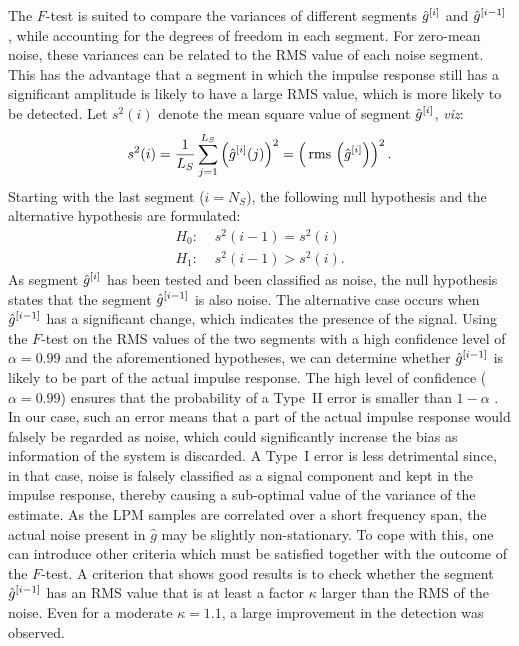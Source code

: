 \begin{enumerate}
  The $F$-test is suited to compare the variances of different segments ${\hat{g}}^{[i]}$ and ${\hat{g}}^{[i-1]}$ \cite{Parsons1974}, while accounting for the degrees of freedom in each segment.
  For zero-mean noise, these variances can be related to the RMS value of each noise segment.
  This has the advantage that a segment in which the impulse response still has a significant amplitude is likely to have a large RMS value, which is more likely to be detected.
  Let $s^2(i)$ denote the mean square value of segment ${\hat{g}}^{[i]}$, \emph{viz}:
  \begin{equation}
    s^2(i) = \frac{1}{L_S} \sum_{j=1}^{L_S} \left({\hat{g}}^{[i]}(j)\right)^2
           = \left( \,\mathrm{rms}\,\left(\hat{g}^{[i]}\right) \right)^2
           \text{.}
  \end{equation}
  Starting with the last segment ($i = N_S$), the following null hypothesis and the alternative hypothesis are formulated:
  \begin{align}
     H_0 :&\,\, s^2(i-1) = s^2(i)\\
     H_1 :&\,\, s^2(i-1) > s^2(i)
     \text{.}
  \end{align}
  As segment ${\hat{g}}^{[i]}$ has been tested and been classified as noise, the null hypothesis states that the segment ${\hat{g}}^{[i-1]}$ is also noise.
  The alternative case occurs when ${\hat{g}}^{[i-1]}$ has a significant change, which indicates the presence of the signal.
  Using the $F$-test on the RMS values of the two segments with a high confidence level of $\alpha=0.99$ and the aforementioned hypotheses, we can determine whether ${\hat{g}}^{[i-1]}$ is likely to be part of the actual impulse response.
  The high level of confidence ($\alpha=0.99$) ensures that the probability of a Type~II error is smaller than $1-\alpha$ \cite{Parsons1974}.
  In our case, such an error means that a part of the actual impulse response would falsely be regarded as noise, which could significantly increase the bias as information of the system is discarded.
  A Type~I error is less detrimental since, in that case, noise is falsely classified as a signal component and kept in the impulse response, thereby causing a sub-optimal value of the variance of the estimate.
  As the LPM samples are correlated over a short frequency span, the actual noise present in $\hat{g}$ may be slightly non-stationary.
  To cope with this, one can introduce other criteria which must be satisfied together with the outcome of the $F$-test.
  A criterion that shows good results is to check whether the segment ${\hat{g}}^{[i-1]}$ has an RMS value that is at least a factor $\kappa$ larger than the RMS of the noise.
  Even for a moderate $\kappa = 1.1$, a large improvement in the detection was observed. 


\end{enumerate}
